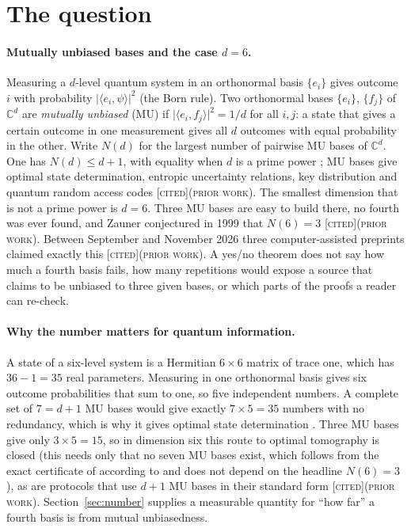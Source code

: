 \documentclass[11pt]{article}
\newcommand{\C}{\mathbb{C}}
\newcommand{\ip}[2]{\langle #1,#2\rangle}
\newcommand{\abs}[1]{\lvert #1\rvert}
\newcommand{\st}[1]{\textsc{[#1]}}
\newcommand{\stcited}{\st{cited}}
\newcommand{\prior}{\textsc{(prior work)}}
\theoremstyle{definition}
\theoremstyle{remark}
\begin{document}
\section{The question}\label{sec:question}

\paragraph{Mutually unbiased bases and the case $d=6$.} Measuring a $d$-level quantum system in an orthonormal basis
$\{e_i\}$ gives outcome $i$ with probability $\abs{\ip{e_i}{\psi}}^2$ (the Born rule). Two orthonormal bases $\{e_i\}$,
$\{f_j\}$ of $\C^d$ are \emph{mutually unbiased} (MU) if $\abs{\ip{e_i}{f_j}}^2=1/d$ for all $i,j$: a state that gives a
certain outcome in one measurement gives all $d$ outcomes with equal probability in the other. Write $N(d)$ for the
largest number of pairwise MU bases of $\C^d$. One has $N(d)\le d+1$, with equality when $d$ is a prime power \cite{WF};
MU bases give optimal state determination, entropic uncertainty relations, key distribution and quantum random
access codes \cite{WF,DEBZ,ABMP} \stcited \prior. The smallest dimension that is not a prime power is $d=6$. Three MU bases
are easy to build there, no fourth was ever found, and Zauner conjectured in 1999 that $N(6)=3$ \cite{Zauner}
\stcited \prior. Between September and November 2026 three computer-assisted preprints claimed exactly this
\cite{OAI,Jaswal1,CWT} \stcited \prior. A yes/no theorem does not say how much a fourth basis fails, how many repetitions would expose a source that claims
to be unbiased to three given bases, or which parts of the proofs a reader can re-check.

\paragraph{Why the number matters for quantum information.} A state of a six-level system is a Hermitian $6\times6$
matrix of trace one, which has $36-1=35$ real parameters. Measuring in one orthonormal basis gives six outcome
probabilities that sum to one, so five independent numbers. A complete set of $7=d+1$ MU bases would give exactly
$7\times5=35$ numbers with no redundancy, which is why it gives optimal state determination \cite{Ivanovic81,WF}. Three MU
bases give only $3\times5=15$, so in dimension six this route to optimal tomography is closed (this needs only that no seven MU bases exist, which follows from the exact certificate of \cite{OAI} according to \cite{Sheet} and does not depend on the headline $N(6)=3$), as are protocols that
use $d+1$ MU bases in their standard form \stcited \prior. Section~\ref{sec:number} supplies a measurable quantity for
``how far'' a fourth basis is from mutual unbiasedness.
\end{document}
